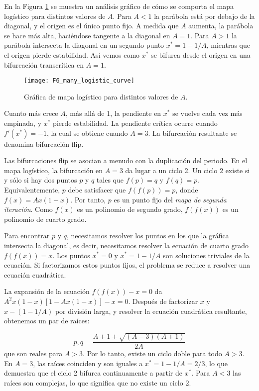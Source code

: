             En la Figura \ref{fig:F6_many_logistic_curve} se muestra un análisis gráfico de cómo se comporta el mapa logístico para distintos valores de $A$. Para $A < 1$ la parábola está por debajo de la diagonal, y el origen es el único punto fijo. A medida que $A$ aumenta, la parábola se hace más alta, haciéndose tangente a la diagonal en $A = 1$. Para $A > 1$ la parábola intersecta la diagonal en un segundo punto $x^{*} = 1 - 1/A$, mientras que el origen pierde estabilidad. Así vemos como $x^{*}$ se bifurca desde el origen en una bifurcación transcrítica en $A = 1$. 

            \begin{figure}[hbtp]
                \centering
                \texttt{[image: F6\_many\_logistic\_curve]}
                \caption{Gráfica de mapa logístico para distintos valores de $A$.}
                \label{fig:F6_many_logistic_curve}
            \end{figure}
            
            Cuanto más crece $A$, más allá de 1, la pendiente en $x^{*}$ se vuelve cada vez más empinada, y $x^{*}$ pierde estabilidad. La pendiente crítica ocurre cuando $f'(x^{*}) = -1$, la cual se obtiene cuando $A = 3$. La bifurcación resultante se denomina bifurcación flip.

            Las bifurcaciones flip se asocian a menudo con la duplicación del periodo. En el mapa logístico, la bifurcación en $A = 3$ da lugar a un ciclo 2. Un ciclo 2 existe si y sólo si hay dos puntos $p$ y $q$ tales que $f(p) = q$  y $f(q) = p$. Equivalentemente, $p$ debe satisfacer que $f(f(p)) = p$, donde $f(x) = Ax (1 - x)$. Por tanto, $p$ es un punto fijo del \emph{mapa de segunda iteración}. Como $f(x)$ es un polinomio de segundo grado, $f(f(x))$ es un polinomio de cuarto grado.

            Para encontrar $p$ y $q$, necesitamos resolver los puntos en los que la gráfica intersecta la diagonal, es decir, necesitamos resolver la ecuación de cuarto grado $f(f(x)) = x$. Los puntos $x^{*} = 0$ y $x^{*} = 1 - 1/A$ son soluciones triviales de la ecuación. Si factorizamos estos puntos fijos, el problema se reduce a resolver una ecuación cuadrática. 

            La expansión de la ecuación $f(f(x)) -x = 0$ da $A^{2}x(1-x) [1 - Ax(1-x)] -x = 0$. Después de factorizar $x$ y $x - (1-1/A)$ por división larga, y resolver la ecuación cuadrática resultante, obtenemos un par de raíces:

            \begin{equation}
                p,q = \frac{A + 1 \pm \sqrt{(A-3) (A+1)} }{2A} 
            \end{equation}
            que son reales para $A > 3$. Por lo tanto, existe un ciclo doble para todo $ A > 3 $. En $ A = 3 $, las raíces coinciden y son iguales a $x^{*} = 1 - 1/A = 2/3$, lo que demuestra que el ciclo 2 bifurca continuamente a partir de $x^{*}$. Para $A < 3$ las raíces son complejas, lo que significa que no existe un ciclo 2.

